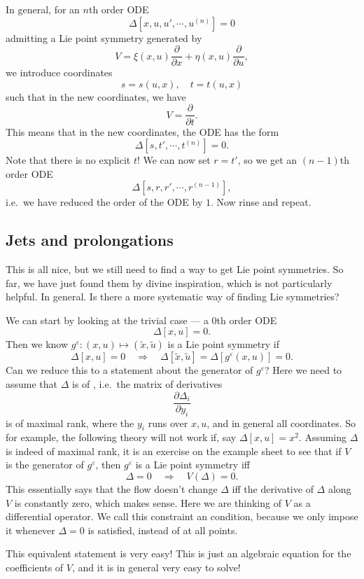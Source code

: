 \documentclass[a4paper]{article}
\begin{document}
In general, for an $n$th order ODE
\[
  \Delta[x, u, u', \cdots, u^{(n)}] = 0
\]
admitting a Lie point symmetry generated by
\[
  V= \xi(x, u) \frac{\partial}{\partial x} + \eta(x, u) \frac{\partial}{\partial u},
\]
we introduce coordinates
\[
  s = s(u, x),\quad t = t(u, x)
\]
such that in the new coordinates, we have
\[
  V = \frac{\partial}{\partial t}.
\]
This means that in the new coordinates, the ODE has the form
\[
  \Delta[s, t', \cdots, t^{(n)} ] = 0.
\]
Note that there is no explicit $t$! We can now set $r = t'$, so we get an $(n - 1)$th order ODE
\[
  \Delta[s, r, r', \cdots, r^{(n - 1)}],
\]
i.e.\ we have reduced the order of the ODE by $1$. Now rinse and repeat.

\subsection{Jets and prolongations}
This is all nice, but we still need to find a way to get Lie point symmetries. So far, we have just found them by divine inspiration, which is not particularly helpful. In general. Is there a more systematic way of finding Lie symmetries?

We can start by looking at the trivial case --- a $0$th order ODE
\[
  \Delta[x, u] = 0.
\]
Then we know $g^\varepsilon: (x, u) \mapsto (\tilde{x}, \tilde{u})$ is a Lie point symmetry if
\[
  \Delta[x, u] = 0\quad\Longrightarrow\quad \Delta[\tilde{x}, \tilde{u}] = \Delta[g^\varepsilon(x, u)] = 0.
\]
Can we reduce this to a statement about the generator of $g^\varepsilon$? Here we need to assume that $\Delta$ is of , i.e.\ the matrix of derivatives
\[
  \frac{\partial \Delta_i}{\partial y_i}
\]
is of maximal rank, where the $y_i$ runs over $x, u$, and in general all coordinates. So for example, the following theory will not work if, say $\Delta[x, u] = x^2$. Assuming $\Delta$ is indeed of maximal rank, it is an exercise on the example sheet to see that if $V$ is the generator of $g^\varepsilon$, then $g^\varepsilon$ is a Lie point symmetry iff
\[
  \Delta = 0 \quad\Longrightarrow\quad V(\Delta) = 0.
\]
This essentially says that the flow doesn't change $\Delta$ iff the derivative of $\Delta$ along $V$ is constantly zero, which makes sense. Here we are thinking of $V$ as a differential operator. We call this constraint an  condition, because we only impose it whenever $\Delta = 0$ is satisfied, instead of at all points.

This equivalent statement is very easy! This is just an algebraic equation for the coefficients of $V$, and it is in general very easy to solve!
\end{document}
